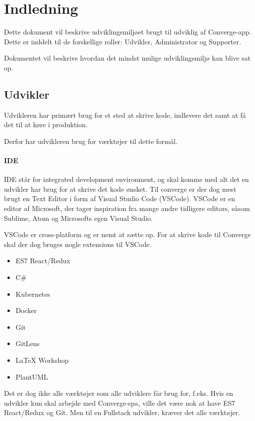 \chapter{Indledning}

Dette dokument vil beskrive udviklingsmiljøet brugt til udviklig af Converge-app. Dette er inddelt til de forskellige roller: Udvikler, Administrator og Supporter.

Dokumentet vil beskrive hvordan det mindst mulige udviklingsmiljø kan blive sat op.

\section{Udvikler}

Udvikleren har primært brug for et sted at skrive kode, indlevere det samt at få det til at køre i produktion.

Derfor har udvikleren brug for værktøjer til dette formål.

\subsubsection{IDE}

IDE står for integrated development environment, og skal komme med alt det en udvikler har brug for at skrive det kode ønsket. Til converge er der dog mest brugt en Text Editor i form af Visual Studio Code (VSCode). VSCode er en editor af Microsoft, der tager inspiration fra mange andre tidligere editors, såsom Sublime, Atom og Microsofts egen Visual Studio.

VSCode er cross-platform og er nemt at sætte op. For at skrive kode til Converge skal der dog bruges nogle extensions til VSCode.

\begin{itemize}
    \item ES7 React/Redux
    \item C#
    \item Kubernetes
    \item Docker
    \item Git
    \item GitLens
    \item LaTeX Workshop
    \item PlantUML
\end{itemize}

Det er dog ikke alle værktøjer som alle udviklere får brug for, f.eks. Hvis en udvikler kun skal arbejde med Converge-spa, ville det være nok at have ES7 React/Redux og Git. Men til en Fullstack udvikler, kræver det alle værktøjer.

